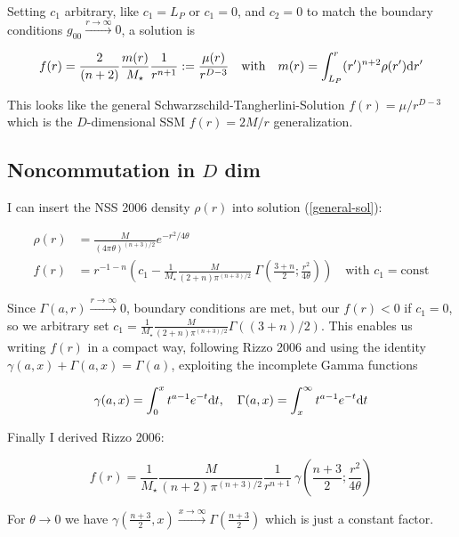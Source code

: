 \documentclass[10pt,a4paper, fleqn]{article}
\begin{document}
Setting $c_1$ arbitrary, like $c_1=L_P$ or $c_1=0$, and $c_2=0$ to match the boundary conditions $g_{00} \xrightarrow{r\to\infty}0$, a solution is

\begin{equation}
f(r) = \frac{2}{(n+2)}\frac{m(r)}{M_\star}\frac{1}{r^{n+1}} := \frac{\mu(r)}{r^{D-3}}
\quad\text{with}\quad m(r) = \int_{L_P}^r (r')^{n+2}\rho(r')\mathrm{d} r'
\end{equation}

This looks like the general Schwarzschild-Tangherlini-Solution $f(r) = \mu / r^{D-3}$ which is the $D$-dimensional SSM $f(r)=2M/r$ generalization.

\subsection{Noncommutation in $D$ dim}

I can insert the NSS 2006 density $\rho(r)$ into solution (\ref{general-sol}):

\begin{align}
\rho(r) &= \frac{M}{(4\pi \theta)^ {(n+3)/2}} e^{ -r^2 / 4 \theta} \\
f(r) &= r^{-1-n} \left(c_1  - \frac{1}{M_\star}\frac{M}{(2+n) \pi^{(n+3)/2}} ~\Gamma \left(\frac{3+n}{2}; \frac{r^2}{4\theta}\right)\right) \quad \text{with } c_1 = \text{const}
\end{align}

Since $\Gamma(a,r) \xrightarrow{r\to\infty} 0$, boundary conditions are met, but our $f(r)<0$ if $c_1=0$, so we arbitrary set $c_1 = \frac{1}{M_\star}\frac{M}{(2+n) \pi^{(n+3)/2}} \Gamma\left( (3+n)/2 \right)$. This enables us writing $f(r)$ in a compact way, following Rizzo 2006 and using the identity $\gamma(a,x) + \Gamma(a,x) = \Gamma(a)$, exploiting the incomplete Gamma functions

\begin{equation}
\gamma(a,x) = \int_0^x t^{a-1} e^{-t} \mathrm{d} t, \quad \Gamma(a,x) = \int_x^\infty t^{a-1} e^{-t} \mathrm{d} t
\end{equation}

Finally I derived Rizzo 2006:

\begin{equation}
f(r) = \frac{1}{M_\star} \frac{M}{(n+2)\pi^{(n+3)/2}} \frac{1}{r^{n+1}} ~\gamma \left( \frac{n+3}{2}; \frac{r^2}{4 \theta} \right)
\end{equation}

For $\theta \to 0$ we have $\gamma(\frac{n+3}{2},x) \xrightarrow{x\to\infty} \Gamma(\frac{n+3}{2})$ which is just a constant factor.
\end{document}
